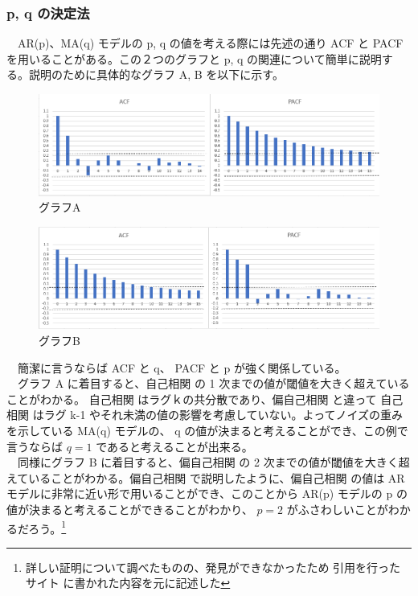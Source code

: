 \documentclass{scrartcl}
\begin{document}
\subsubsection{p, q の決定法}
\label{sec:org0f3006e}
　AR(p)、MA(q) モデルの p, q の値を考える際には先述の通り ACF と PACF を用いることがある。この２つのグラフと p, q の関連について簡単に説明する。説明のために具体的なグラフ A, B を以下に示す。\\
\begin{figure}[htbp]
\centering
\includegraphics[width=16cm]{./acf-pacf.PNG}
\caption{グラフA}
\end{figure}

\begin{figure}[htbp]
\centering
\includegraphics[width=16cm]{./pacf-acf.PNG}
\caption{グラフB}
\end{figure}

　簡潔に言うならば ACF と q、 PACF と p が強く関係している。\\
　グラフ A に着目すると、自己相関 の 1 次までの値が閾値を大きく超えていることがわかる。 自己相関 はラグｋの共分散であり、偏自己相関 と違って 自己相関 はラグ k-1 やそれ未満の値の影響を考慮していない。よってノイズの重みを示している MA(q) モデルの、 q の値が決まると考えることができ、この例で言うならば \(q = 1\) であると考えることが出来る。\\
　同様にグラフ B に着目すると、偏自己相関 の 2 次までの値が閾値を大きく超えていることがわかる。偏自己相関 で説明したように、偏自己相関 の値は AR モデルに非常に近い形で用いることができ、このことから AR(p) モデルの p の値が決まると考えることができることがわかり、 \(p = 2\) がふさわしいことがわかるだろう。\footnote{詳しい証明について調べたものの、発見ができなかったため 引用を行ったサイト \cite{stat510} に書かれた内容を元に記述した}\\
\end{document}
